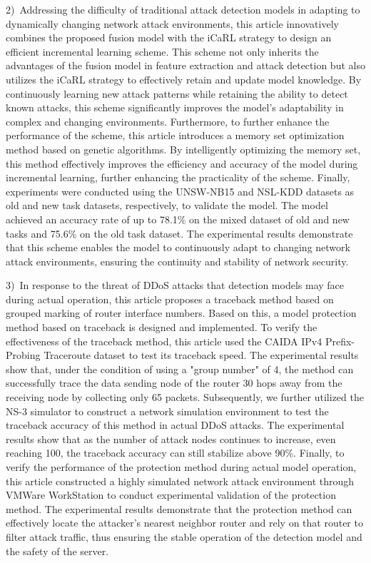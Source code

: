 \begin{eabstract}
2)~Addressing the difficulty of traditional attack detection models in adapting to dynamically changing network attack environments, this article innovatively combines the proposed fusion model with the iCaRL strategy to design an efficient incremental learning scheme.
This scheme not only inherits the advantages of the fusion model in feature extraction and attack detection but also utilizes the iCaRL strategy to effectively retain and update model knowledge.
By continuously learning new attack patterns while retaining the ability to detect known attacks, this scheme significantly improves the model's adaptability in complex and changing environments.
Furthermore, to further enhance the performance of the scheme, this article introduces a memory set optimization method based on genetic algorithms.
By intelligently optimizing the memory set, this method effectively improves the efficiency and accuracy of the model during incremental learning, further enhancing the practicality of the scheme.
Finally, experiments were conducted using the UNSW-NB15 and NSL-KDD datasets as old and new task datasets, respectively, to validate the model.
The model achieved an accuracy rate of up to 78.1\% on the mixed dataset of old and new tasks and 75.6\% on the old task dataset.
The experimental results demonstrate that this scheme enables the model to continuously adapt to changing network attack environments, ensuring the continuity and stability of network security.\par

3)~In response to the threat of DDoS attacks that detection models may face during actual operation, this article proposes a traceback method based on grouped marking of router interface numbers.
Based on this, a model protection method based on traceback is designed and implemented.
To verify the effectiveness of the traceback method, this article used the CAIDA IPv4 Prefix-Probing Traceroute dataset to test its traceback speed.
The experimental results show that, under the condition of using a "group number" of 4, the method can successfully trace the data sending node of the router 30 hops away from the receiving node by collecting only 65 packets.
Subsequently, we further utilized the NS-3 simulator to construct a network simulation environment to test the traceback accuracy of this method in actual DDoS attacks.
The experimental results show that as the number of attack nodes continues to increase, even reaching 100, the traceback accuracy can still stabilize above 90\%.
Finally, to verify the performance of the protection method during actual model operation, this article constructed a highly simulated network attack environment through VMWare WorkStation to conduct experimental validation of the protection method.
The experimental results demonstrate that the protection method can effectively locate the attacker's nearest neighbor router and rely on that router to filter attack traffic, thus ensuring the stable operation of the detection model and the safety of the server.
\end{eabstract}

